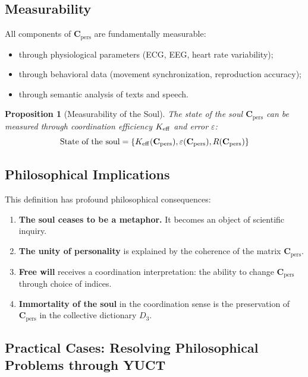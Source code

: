 \documentclass[12pt,a4paper]{article}
\newcommand{\eps}{\varepsilon}
\newcommand{\Cpers}{\mathbf{C}_{\text{pers}}}
\newtheorem{proposition}{Proposition}[section]
\begin{document}
	\subsection{Measurability}
	
	All components of \(\Cpers\) are fundamentally measurable:
	\begin{itemize}
		\item through physiological parameters (ECG, EEG, heart rate variability);
		\item through behavioral data (movement synchronization, reproduction accuracy);
		\item through semantic analysis of texts and speech.
	\end{itemize}
	
	\begin{proposition}[Measurability of the Soul]
		The state of the soul \(\Cpers\) can be measured through coordination efficiency \(\Keff\) and error \(\eps\):
		\[
		\text{State of the soul} = \{\Keff(\Cpers), \eps(\Cpers), R(\Cpers)\}
		\]
	\end{proposition}
	
	\subsection{Philosophical Implications}
	
	This definition has profound philosophical consequences:
	
	\begin{enumerate}
		\item \textbf{The soul ceases to be a metaphor.} It becomes an object of scientific inquiry.
		\item \textbf{The unity of personality} is explained by the coherence of the matrix \(\Cpers\).
		\item \textbf{Free will} receives a coordination interpretation: the ability to change \(\Cpers\) through choice of indices.
		\item \textbf{Immortality of the soul} in the coordination sense is the preservation of \(\Cpers\) in the collective dictionary \(D_3\).
	\end{enumerate}
	
	\subsection{Practical Cases: Resolving Philosophical Problems through YUCT}
	\label{sec:practical-cases}
	
\end{document}
